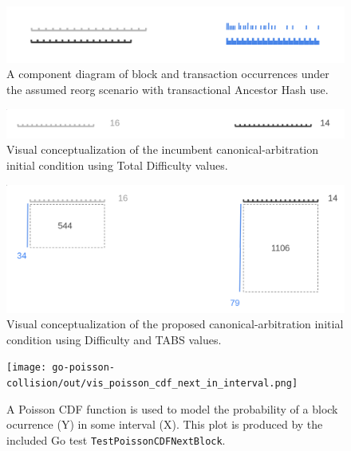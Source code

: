 \documentclass[11pt]{article}
\theoremstyle{plain}
\begin{document}
\begin{figure}[tph]
\centering
\includegraphics[width=1.0\textwidth]{vis_blocksegment_canonpref_abstract.png}
\caption{
  A component diagram of block and transaction occurrences under the assumed
reorg scenario with transactional Ancestor Hash use.
}
\label{fig:blocksegment_forks_canonpref_incumbent_ex}
\end{figure}

\begin{figure}[tph]
\centering
\includegraphics[width=1.0\textwidth]{vis_blocksegment_canonpref_incumbent_ex.png}
\caption{Visual conceptualization of the incumbent canonical-arbitration
initial condition using Total Difficulty values.
}
\label{fig:blocksegment_forks_canonpref_incumbent_ex}
\end{figure}


\begin{figure}[tph]
\centering
\includegraphics[width=1.0\textwidth]{vis_blocksegment_canonpref_proposed_ex.png}
\caption{Visual conceptualization of the proposed canonical-arbitration initial
condition using Difficulty and TABS values.
}
\label{fig:blocksegment_forks_canonpref_proposed_ex}
\end{figure}

\begin{figure}[tph]
    \label{go-poisson-collision-cdf-interval}
    \centering
    \texttt{[image: go-poisson-collision/out/vis\_poisson\_cdf\_next\_in\_interval.png]}
    \caption{
      A Poisson CDF function is used to model the probability of a block
ocurrence (Y) in some interval (X).
      This plot is produced by the included Go test
\texttt{TestPoissonCDFNextBlock}.
    }
\end{figure}
\end{document}
